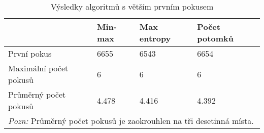 \begin{table}[H]
\centering
\begin{tabular}{l l l l}
\toprule
 & Min-max & Max entropy & Počet potomků  \\
\midrule

První pokus 
& 6655 & 6543 & 6654  \\


Maximální počet pokusů 
& 6 & 6 & 6  \\

Průměrný počet pokusů 
& 4.478 & 4.416 & 4.392 \\
\bottomrule
\multicolumn{4}{l}{\footnotesize \textit{Pozn:}
Průměrný počet pokusů je zaokrouhlen na tři desetinná místa.}
\end{tabular}
\caption{Výsledky algoritmů s větším prvním pokusem}\label{tabvysokyprvnipokus}
\end{table}







